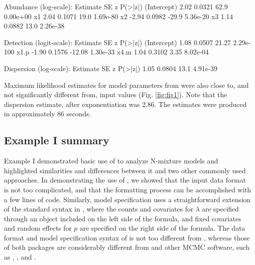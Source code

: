 \documentclass[codesnippet]{jss}
\begin{document}
\begin{CodeOutput}
Abundance (log-scale):
            Estimate       SE       z     P(>|z|)
(Intercept)     2.02   0.0321    62.9    0.00e+00
x1              2.04   0.1071    19.0    1.69e-80
x2             -2.94   0.0982   -29.9    5.36e-20
x3              1.14   0.0882    13.0    2.26e-38

Detection (logit-scale):
            Estimate       SE       z     P(>|z|)
(Intercept)     1.08   0.0507   21.27   2.29e-100
x1.p           -1.90   0.1576  -12.08    1.30e-33
x4.m            1.04   0.3102    3.35    8.02e-04

Dispersion (log-scale):
Estimate          SE     z    P(>|z|)
1.05          0.0804  13.1   4.91e-39
\end{CodeOutput}

Maximum likelihood estimates for model parameters from  were also close to, and not significantly different from, input values (Fig. \ref{fig:fig1}). Note that the dispersion estimate, after exponentiation was 2.86. The  estimates were produced in approximately 86 seconds.

\subsection[Example I summary]{Example I summary}
Example I demonstrated basic use of  to analyze N-mixture models and highlighted similarities and differences between it and two other commonly used approaches. In demonstrating the use of , we showed that the input data format is not too complicated, and that the formatting process can be accomplished with a few lines of code. Similarly, model specification uses a straightforward extension of the standard syntax in , where the counts and covariates for $\lambda$ are specified through an  object included on the left side of the formula, and fixed covariates and random effects for $p$ are specified on the right side of the formula. The data format and model specification syntax of  is not too different from , whereas those of both packages are considerably different from  and other MCMC software, such as , , and .
\end{document}
